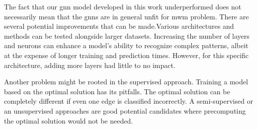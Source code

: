 The fact that our \gls{gnn} model developed in this work underperformed does not necessarily mean that the \gls{gnn}s are in general unfit for \gls{mwm} problem. There are several potential improvements that can be made.Various architectures and methods can be tested alongside larger datasets. Increasing the number of layers and neurons can enhance a model's ability to recognize complex patterns, albeit at the expense of longer training and prediction times. However, for this specific architecture, adding more layers had little to no impact. 

Another problem might be rooted in the supervised approach. Training a model based on the optimal solution has its pitfalls. The optimal solution can be completely different if even one edge is classified incorrectly. A semi-supervised or an unsupervised approaches are good potential candidates where precomputing the optimal solution would not be needed.